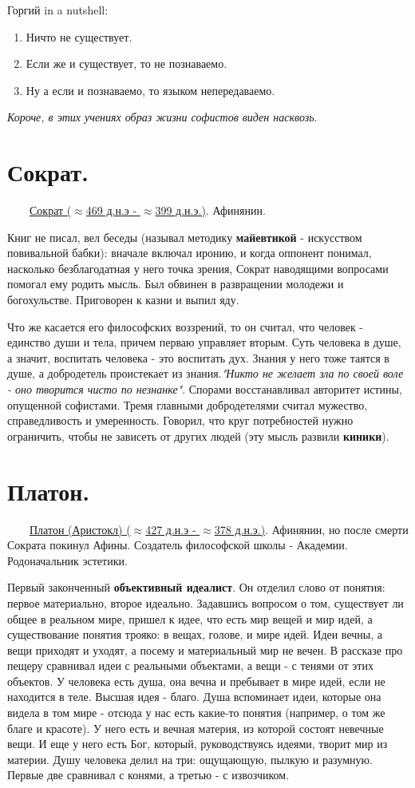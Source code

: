 \documentclass[12pt,a4paper]{article}
\begin{document}
Горгий in a nutshell:
\begin{enumerate}
\item Ничто не существует.
\item Если же и существует, то не познаваемо.
\item Ну а если и познаваемо, то языком непередаваемо.
\end{enumerate}

\textit{Короче, в этих учениях образ жизни софистов виден насквозь}.

\section{Сократ.}
\ \ \ \
\underline{Сократ ($\approx$469 д.н.э - $\approx$399 д.н.э.)}. Афинянин.

 Книг не писал, вел беседы (называл методику \textbf{майевтикой} - искусством повивальной бабки): вначале включал иронию, и когда оппонент понимал, насколько безблагодатная у него точка зрения, Сократ наводящими вопросами помогал ему родить мысль. Был обвинен в развращении молодежи и богохульстве. Приговорен к казни и выпил яду.

Что же касается его философских воззрений, то он считал, что человек - единство души и тела, причем перваю управляет вторым. Суть человека в душе, а значит, воспитать человека - это воспитать дух. Знания у него тоже таятся в душе, а добродетель проистекает из знания.\textit{"Никто не желает зла по своей воле - оно творится чисто по незнанке"}. Спорами восстанавливал авторитет истины, опущенной софистами. 
Тремя главными добродетелями считал мужество, справедливость и умеренность. Говорил, что круг потребностей нужно ограничить, чтобы не зависеть от других людей (эту мысль развили \textbf{киники}).

\section{Платон.}
\ \ \ \
\underline{Платон (Аристокл) ($\approx$427 д.н.э - $\approx$378 д.н.э.)}. Афинянин, но после смерти Сократа покинул Афины. Создатель философской школы - Академии. Родоначальник эстетики.

Первый законченный \textbf{объективный идеалист}. Он отделил слово от понятия: первое материально, второе идеально. Задавшись вопросом о том, существует ли общее в реальном мире, пришел к идее, что есть мир вещей и мир идей, а существование понятия трояко: в вещах, голове, и мире идей. Идеи вечны, а вещи приходят и уходят, а посему и материальный мир не вечен. В рассказе про пещеру сравнивал идеи с реальными объектами, а вещи - с тенями от этих объектов. У человека есть душа, она вечна и пребывает в мире идей, если не находится в теле. Высшая идея - благо. Душа вспоминает идеи, которые она видела в том мире - отсюда у нас есть какие-то понятия (например, о том же благе и красоте).
У него есть и вечная материя, из которой состоят невечные вещи. И еще у него есть Бог, который, руководствуясь идеями, творит мир из материи. Душу человека делил на три: ощущающую, пылкую и разумную. Первые две сравнивал с конями, а третью - с извозчиком.
\end{document}
